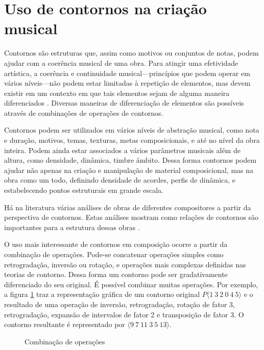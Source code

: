 \section{Uso de contornos na criação musical}
\label{sec:uso-de-contornos}

Contornos são estruturas que, assim como motivos ou conjuntos de
notas, podem ajudar com a coerência musical de uma obra. Para atingir
uma efetividade artística, a coerência e continuidade
musical---princípios que podem operar em vários níveis---não podem
estar limitadas à repetição de elementos, mas devem existir em um
contexto em que tais elementos sejam de alguma maneira diferenciados
\cite[p. 296]{kliewer75:aspects}. Diversas maneiras de diferenciação
de elementos são possíveis através de combinações de operações de
contornos.

Contornos podem ser utilizados em vários níveis de abstração musical,
como nota e duração, motivos, temas, texturas, metas composicionais, e
até no nível da obra inteira. Podem ainda estar associados a vários
parâmetros musicais além de altura, como densidade, dinâmica, timbre
âmbito. Dessa forma contornos podem ajudar não apenas na criação e
manipulação de material composicional, mas na obra como um todo,
definindo densidade de acordes, perfis de dinâmica, e estabelecendo
pontos estruturais em grande escala.

Há na literatura várias análises de obras de diferentes compositores a
partir da perspectiva de contornos. Estas análises mostram como
relações de contornos são importantes para a estrutura dessas obras
\cite{friedmann85:methodology,clifford95:contour,beard03:contour}.

O uso mais interessante de contornos em composição ocorre a partir da
combinação de operações. Pode-se concatenar operações simples como
retrogradação, inversão ou rotação, e operações mais complexas
definidas nas teorias de contorno. Dessa forma um contorno pode ser
gradativamente diferenciado do seu original. É possível combinar
muitas operações. Por exemplo, a figura \ref{fig:combinacao-operacoes}
traz a representação gráfica de um contorno original
$P\langle1\:3\:2\:0\:4\:5\rangle$ e o resultado de uma operação de
inversão, retrogradação, rotação de fator 3, retrogradação, expansão
de intervalos de fator 2 e transposição de fator 3. O contorno
resultante é representado por $\langle9\:7\:11\:3\:5\:13\rangle$.

\begin{figure}
  \centering
  \caption{Combinação de operações}
  \label{fig:combinacao-operacoes}
\end{figure}

